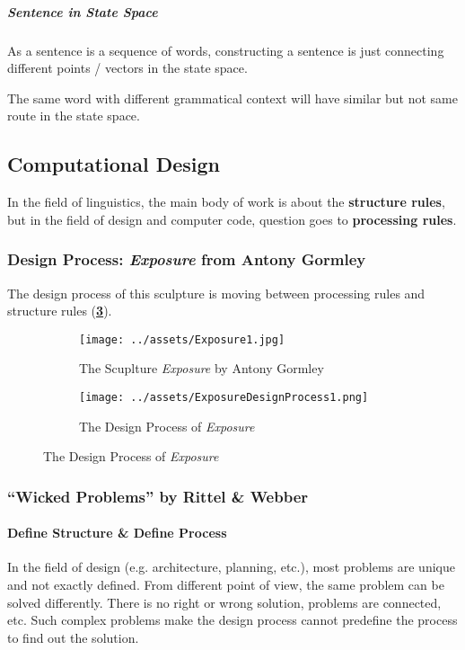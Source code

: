 \documentclass[a4paper, openany]{book}
\begin{document}
\subparagraph{Sentence in State Space}

As a sentence is a sequence of words, constructing a sentence is just connecting different points / vectors in the state space.

The same word with different grammatical context will have similar but not same route in the state space.

\subsection{Computational Design}

In the field of linguistics, the main body of work is about the \textbf{structure rules}, but in the field of design and computer code, question goes to \textbf{processing rules}.

\subsubsection{Design Process: \textit{Exposure} from Antony Gormley}

The design process of this sculpture is moving between processing rules and structure rules (\textbf{\cref{fig:ExposeDesignProcess1}}).

\begin{figure}[htbp]
  \centering
  \begin{subfigure}{0.39\textwidth}
    \centering
    \texttt{[image: ../assets/Exposure1.jpg]}
    \caption{The Scuplture \textit{Exposure} by Antony Gormley}
    \label{fig:Exposure1}
  \end{subfigure}
  \begin{subfigure}{0.59\textwidth}
    \centering
    \texttt{[image: ../assets/ExposureDesignProcess1.png]}
    \caption{The Design Process of \textit{Exposure}}
    \label{fig:ExposeDesignProcess1}
  \end{subfigure}
\end{figure}

\subsubsection{``Wicked Problems'' by Rittel \& Webber}

\paragraph{Define Structure \& Define Process}

In the field of design (e.g. architecture, planning, etc.), most problems are unique and not exactly defined. From different point of view, the same problem can be solved differently. There is no right or wrong solution, problems are connected, etc. Such complex problems make the design process cannot predefine the process to find out the solution.
\end{document}
